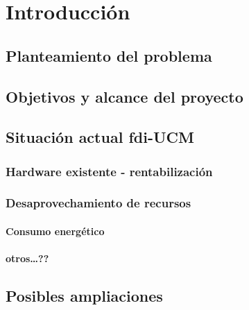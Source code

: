 \chapter{Introducci\'on}

\section{Planteamiento del problema}

\section{Objetivos y alcance del proyecto}

\section{Situaci\'on actual fdi-UCM}

\subsection{Hardware existente - rentabilizaci\'on}

\subsection{Desaprovechamiento de recursos}

\subsubsection{Consumo energ\'etico}

\subsubsection{otros\ldots??}

\section{Posibles ampliaciones}